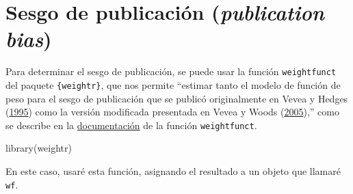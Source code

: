 \documentclass[
  bookmarksnumbered]{article}
\newenvironment{Shaded}{\begin{snugshade}}{\end{snugshade}}
\newcommand{\AttributeTok}[1]{\textcolor[rgb]{0.00,0.34,0.68}{#1}}
\newcommand{\ConstantTok}[1]{\textcolor[rgb]{0.67,0.33,0.00}{#1}}
\newcommand{\FunctionTok}[1]{\textcolor[rgb]{0.39,0.29,0.61}{#1}}
\newcommand{\NormalTok}[1]{\textcolor[rgb]{0.12,0.11,0.11}{#1}}
\newcommand{\OtherTok}[1]{\textcolor[rgb]{0.00,0.43,0.16}{#1}}
\newcommand{\SpecialCharTok}[1]{\textcolor[rgb]{0.24,0.68,0.91}{#1}}
\begin{document}
\hypertarget{sesgo-pub}{%
\section{\texorpdfstring{Sesgo de publicación (\emph{publication bias})}{Sesgo de publicación (publication bias)}}\label{sesgo-pub}}

Para determinar el sesgo de publicación, se puede usar la función \texttt{weightfunct} del paquete \texttt{\{weightr\}}, que nos permite ``estimar tanto el modelo de función de peso para el sesgo de publicación que se publicó originalmente en Vevea y Hedges (\protect\hyperlink{ref-veveaGeneralLinearModel1995}{1995}) como la versión modificada presentada en Vevea y Woods (\protect\hyperlink{ref-veveaPublicationBiasResearch2005}{2005}),'' como se describe en la \href{https://www.rdocumentation.org/packages/weightr/versions/2.0.2/topics/weightfunct}{documentación} de la función \texttt{weightfunct}.

\begin{Shaded}
\begin{Highlighting}[]
\FunctionTok{library}\NormalTok{(weightr)}
\end{Highlighting}
\end{Shaded}

En este caso, usaré esta función, asignando el resultado a un objeto que llamaré \texttt{wf}.

\begin{Shaded}
\end{Shaded}
\end{document}
